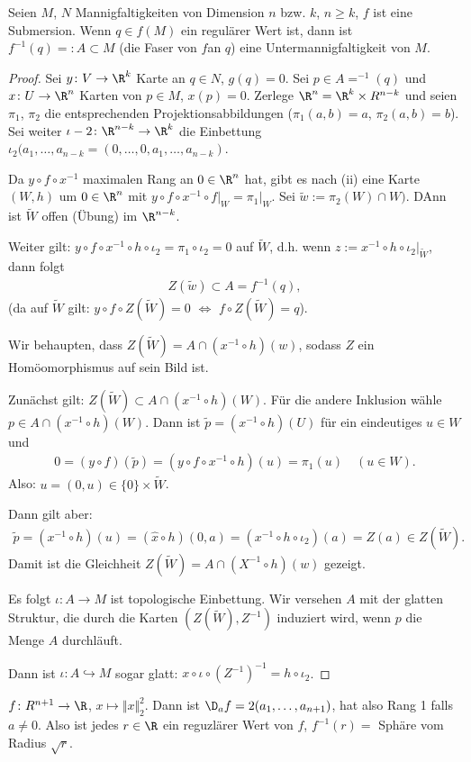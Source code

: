 \begin{proposition}
	Seien $M$, $N$ Mannigfaltigkeiten von Dimension $n$ bzw. $k$, $n\ge k$, $f$ ist eine Submersion. Wenn $q\in f(M)$ ein regulärer Wert ist, dann ist $f^{-1}(q) =: A\subset M$ (die Faser von $f$an $q$) eine Untermannigfaltigkeit von $M$.
\end{proposition}
\begin{proof}
	Sei $y\colon V\to\R^k$ Karte an $q\in N$, $g(q) = 0$. Sei $p\in A=^{-1}(q)$ und $x\colon U\to\R^n$ Karten von $p\in M$, $x(p) = 0$. Zerlege $\R^n=\R^k\times R^{n-k}$ und seien $\pi_1$, $\pi_2$ die entsprechenden Projektionsabbildungen ($\pi_1(a,b) = a$, $\pi_2(a,b) = b$). Sei weiter $\iota-2\colon\R^{n-k}\to \R^k$ die Einbettung $\iota_2(a_1,\dots,a_{n-k}=(0,\dots,0,a_1,\dots,a_{n-k})$.
	
	Da $y\circ f\circ x^{-1}$ maximalen Rang an $0\in \R^n$ hat, gibt es nach  (ii) eine Karte $(W,h)$ um $0\in\R^n$ mit $y\circ f\circ x^{-1}\circ f\big|_W = \pi_1\big|_W$. Sei $\tilde w := \pi_2(W)\cap W)$. DAnn ist $\tilde W$ offen (Übung) im $\R^{n-k}$.
	
	Weiter gilt: $y\circ f\circ x^{-1}\circ h\circ\iota_2 = \pi_1\circ\iota_2=0$ auf $\tilde W$, d.h. wenn $z:= x^{-1}\circ h\circ\iota_2\big|_{\tilde W}$, dann folgt\begin{align*}
		Z(\tilde w) \subset A = f^{-1}(q),
	\end{align*}
	(da auf $\tilde W$ gilt: $y\circ f\circ Z(\tilde W) = 0$ $\Leftrightarrow$ $f\circ Z(\tilde W) = q$).
	
	Wir behaupten, dass $Z(\tilde W) = A\cap (x^{-1}\circ h)(w)$, sodass $Z$ ein Homöomorphismus auf sein Bild ist.
	
	Zunächst gilt: $Z(\tilde W)\subset A\cap(x^{-1}\circ h)(W)$. Für die andere Inklusion wähle $p\in A\cap (x^{-1}\circ h)(W)$. Dann ist $\tilde p = (x^{-1}\circ h)(U)$ für ein eindeutiges $u\in W$ und \begin{align*}
		0 = (y\circ f)(\tilde p) = (y\circ f\circ x^{-1}\circ h)(u) = \pi_1(u)\quad(u\in W).
	\end{align*}
	Also: $u=(0,u)\in\{0\}\times\tilde W$.
	
	Dann gilt aber: \begin{align*}\tilde p = (x^{-1}\circ h)(u) = (\hat x\circ h)(0,a) = (x^{-1}\circ h\circ\iota_2)(a) = Z(a)\in Z(\tilde W).
	\end{align*}
	Damit ist die Gleichheit $Z(\tilde W) = A\cap (X^{-1}\circ h)(w)$ gezeigt.
	
	Es folgt $\iota:A\to M$ ist topologische Einbettung. Wir versehen $A$ mit der glatten Struktur, die durch die Karten $(Z(\tilde W), Z^{-1})$ induziert wird, wenn $p$ die Menge $A$ durchläuft.
	
	Dann ist $\iota\colon A\hookrightarrow M$ sogar glatt: $x\circ \iota\circ (Z^{-1})^{-1} = h\circ\iota_2$.
\end{proof}

\begin{example}
	$f\colon R^{n+1}\to \R$, $x\mapsto \Vert x\Vert_2^2$. Dann ist $\D_a f = 2(a_1,\dots,a_{n+1})$, hat also Rang 1 falls $a\neq 0$. Also ist jedes $r\in \R$ ein reguzlärer Wert von $f$, $f^{-1}(r)=$ Sphäre vom Radius $\sqrt r$.
\end{example}